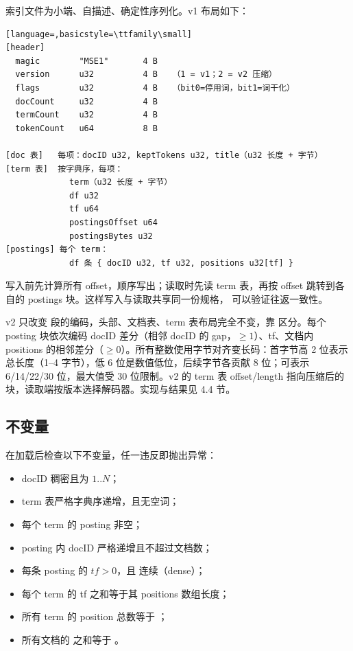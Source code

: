 索引文件为小端、自描述、确定性序列化。v1 布局如下：

\begin{lstlisting}[language=,basicstyle=\ttfamily\small]
[header]
  magic        "MSE1"       4 B
  version      u32          4 B   （1 = v1；2 = v2 压缩）
  flags        u32          4 B   （bit0=停用词，bit1=词干化）
  docCount     u32          4 B
  termCount    u32          4 B
  tokenCount   u64          8 B

[doc 表]   每项：docID u32, keptTokens u32, title（u32 长度 + 字节）
[term 表]  按字典序，每项：
             term（u32 长度 + 字节）
             df u32
             tf u64
             postingsOffset u64
             postingsBytes u32
[postings] 每个 term：
             df 条 { docID u32, tf u32, positions u32[tf] }
\end{lstlisting}

写入前先计算所有 offset，顺序写出；读取时先读 term 表，再按 offset 跳转到各自的 postings 块。这样写入与读取共享同一份规格， 可以验证往返一致性。

v2 只改变 \code{[postings]} 段的编码，头部、文档表、term 表布局完全不变，靠  区分。每个 posting 块依次编码 docID 差分（相邻 docID 的 gap，$\ge 1$）、tf、文档内 positions 的相邻差分（$\ge 0$）。所有整数使用字节对齐变长码：首字节高 2 位表示总长度（1--4 字节），低 6 位是数值低位，后续字节各贡献 8 位；可表示 6/14/22/30 位，最大值受 30 位限制。v2 的 term 表 offset/length 指向压缩后的块，读取端按版本选择解码器。实现与结果见 4.4 节。

\subsection{不变量}

 在加载后检查以下不变量，任一违反即抛出异常：

\begin{itemize}
  \item docID 稠密且为 $1..N$；
  \item term 表严格字典序递增，且无空词；
  \item 每个 term 的 posting 非空；
  \item posting 内 docID 严格递增且不超过文档数；
  \item 每条 posting 的 $tf > 0$，且  连续（dense）；
  \item 每个 term 的 tf 之和等于其 positions 数组长度；
  \item 所有 term 的 position 总数等于 ；
  \item 所有文档的  之和等于 。
\end{itemize}

